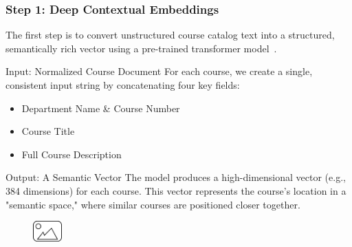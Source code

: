 \documentclass[aspectratio=169,10pt]{beamer}
\begin{document}
\begin{frame}
    \frametitle{Step 1: Deep Contextual Embeddings}

    The first step is to convert unstructured course catalog text into a structured, semantically rich vector using a pre-trained transformer model~\cite{devlin2019bertpretrainingdeepbidirectional, reimers-2019-sentence-bert}.
    
    \fontsize{9}{9}\selectfont
    \begin{block}{Input: Normalized Course Document}
        For each course, we create a single, consistent input string by concatenating four key fields:
        \begin{itemize}
            \item Department Name \& Course Number
            \item Course Title
            \item Full Course Description
        \end{itemize}
    \end{block}

    \begin{block}{Output: A Semantic Vector}
        The model produces a high-dimensional vector (e.g., 384 dimensions) for each course. This vector represents the course's location in a "semantic space," where similar courses are positioned closer together.
    \end{block}
    
    \begin{figure}
        \centering
        \includegraphics[width=0.1\textwidth]{placeholder.png}
    \end{figure}

\end{frame}
\end{document}
